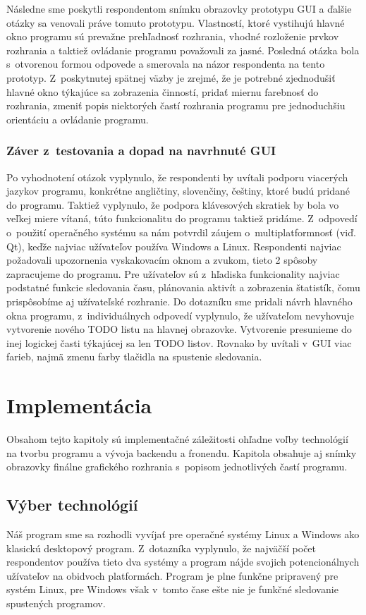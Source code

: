 \documentclass[]{article}
\begin{document}
Následne sme poskytli respondentom snímku obrazovky prototypu GUI a ďalšie otázky sa venovali práve tomuto prototypu. Vlastností, ktoré vystihujú hlavné okno programu sú prevažne prehľadnosť rozhrania, vhodné rozloženie prvkov rozhrania a taktiež ovládanie programu považovali za jasné. Posledná otázka bola s~otvorenou formou odpovede a smerovala na názor respondenta na tento prototyp. Z~poskytnutej spätnej väzby je zrejmé, že je potrebné zjednodušiť hlavné okno týkajúce sa zobrazenia činností, pridať miernu farebnosť do rozhrania, zmeniť popis niektorých častí rozhrania programu pre jednoduchšiu orientáciu a ovládanie programu.

\subsubsection{Záver z~testovania a dopad na navrhnuté GUI}

Po vyhodnotení otázok vyplynulo, že respondenti by uvítali podporu viacerých jazykov programu, konkrétne angličtiny, slovenčiny, češtiny, ktoré budú pridané do programu. Taktiež vyplynulo, že podpora klávesových skratiek by bola vo veľkej miere vítaná, túto funkcionalitu do programu taktiež pridáme. Z~odpovedí o~použití operačného systému sa nám potvrdil záujem o~multiplatformnosť (viď. Qt\cite{doc_qt}), keďže najviac užívateľov používa Windows a Linux. Respondenti najviac požadovali upozornenia vyskakovacím oknom a zvukom, tieto 2 spôsoby zapracujeme do programu. Pre užívateľov sú z~hľadiska funkcionality najviac podstatné funkcie sledovania času, plánovania aktivít a zobrazenia štatistík, čomu prispôsobíme aj užívateľské rozhranie. Do dotazníku sme pridali návrh hlavného okna programu, z~individuálnych odpovedí vyplynulo, že užívateľom nevyhovuje vytvorenie nového TODO listu na hlavnej obrazovke. Vytvorenie presunieme do inej logickej časti týkajúcej sa len TODO listov. Rovnako by uvítali v~GUI viac farieb, najmä zmenu farby tlačidla na spustenie sledovania. 

\section{Implementácia}

Obsahom tejto kapitoly sú implementačné záležitosti ohľadne voľby technológií na tvorbu programu a vývoja backendu a fronendu. Kapitola obsahuje aj snímky obrazovky finálne grafického rozhrania s~popisom jednotlivých častí programu. 

\subsection{Výber technológií}
Náš program sme sa rozhodli vyvíjať pre operačné systémy Linux a Windows ako klasickú desktopový program. Z~dotazníka vyplynulo, že najväčší počet respondentov používa tieto dva  systémy a program nájde svojich potencionálnych užívateľov na obidvoch platformách. Program je plne funkčne pripravený pre systém Linux, pre Windows však v~tomto čase ešte nie je funkčné sledovanie spustených programov.
\end{document}
